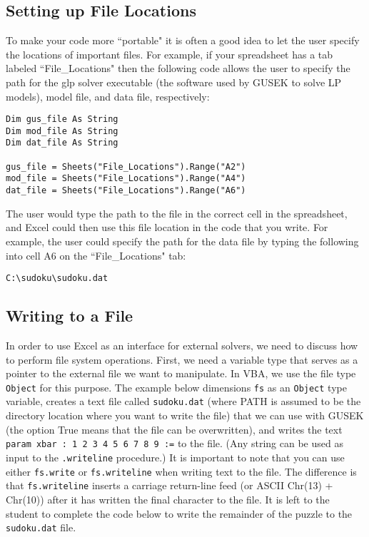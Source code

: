 \documentclass[10pt]{article}
\begin{document}
\subsection{Setting up File Locations}
\label{sec:filelocations}
To make your code more ``portable" it is often a good idea to let the user specify the locations of important files.  For example, if your spreadsheet has a tab labeled ``File\_Locations" then the following code allows the user to specify the path for the glp solver executable (the software used by GUSEK to solve LP models), model file, and data file, respectively:
\begin{verbatim}
Dim gus_file As String
Dim mod_file As String
Dim dat_file As String

gus_file = Sheets("File_Locations").Range("A2")
mod_file = Sheets("File_Locations").Range("A4")
dat_file = Sheets("File_Locations").Range("A6")
\end{verbatim}
The user would type the path to the file in the correct cell in the spreadsheet, and Excel could then use this file location in the code that you write.  For example, the user could specify the path for the data file by typing the following into cell A6 on the ``File\_Locations" tab:
\begin{verbatim}
C:\sudoku\sudoku.dat
\end{verbatim}

\subsection{Writing to a File}
\label{sec:write}
In order to use Excel as an interface for external solvers, we need to discuss how to perform file system operations.  First, we need a variable type that serves as a pointer to the external file we want to manipulate.  In VBA, we use the file type {\tt Object} for this purpose.  The example below dimensions {\tt fs} as an {\tt Object} type variable, creates a text file called {\tt sudoku.dat} (where PATH is assumed to be the directory location where you want to write the file) that we can use with GUSEK (the option True means that the file can be overwritten), and writes the text {\tt param xbar :   1 2 3 4 5 6 7 8 9 :=} to the file.  (Any string can be used as input to the {\tt .writeline} procedure.)  It is important to note that you can use either {\tt fs.write} or {\tt fs.writeline} when writing text to the file.  The difference is that {\tt fs.writeline} inserts a carriage return-line feed (or ASCII Chr(13) + Chr(10)) after it has written the final character to the file.  It is left to the student to complete the code below to write the remainder of the puzzle to the {\tt sudoku.dat} file.
\end{document}
